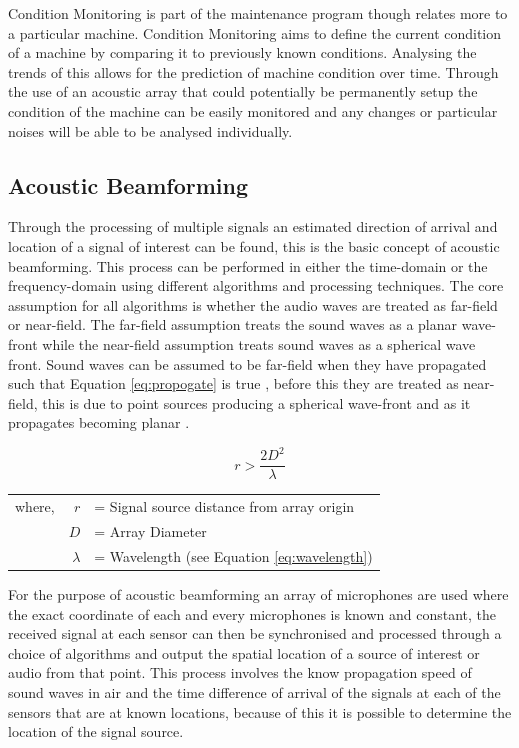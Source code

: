 \documentclass{UoNMCHA}
\numberwithin{equation}{section}
\begin{document}
    Condition Monitoring is part of the maintenance program though relates more to a particular machine. Condition Monitoring aims to define the current condition of a machine by comparing it to previously known conditions. Analysing the trends of this allows for the prediction of machine condition over time. Through the use of an acoustic array that could potentially be permanently setup the condition of the machine can be easily monitored and any changes or particular noises will be able to be analysed individually.
\subsection{Acoustic Beamforming} \label{sec:Beamforming}
    Through the processing of multiple signals an estimated direction of arrival and location of a signal of interest can be found, this is the basic concept of acoustic beamforming. This process can be performed in either the time-domain or the frequency-domain using different algorithms and processing techniques. The core assumption for all algorithms is whether the audio waves are treated as far-field or near-field. The far-field assumption treats the sound waves as a planar wave-front while the near-field assumption treats sound waves as a spherical wave front. Sound waves can be assumed to be far-field when they have propagated such that Equation \ref{eq:propogate} is true \citep{McC01}, before this they are treated as near-field, this is due to point sources producing a spherical wave-front and as it propagates becoming planar \citep{Yan05}. 
    
    \begin{equation}
        r > \frac{2D^2}{\lambda}
        \label{eq:propogate}
    \end{equation}
    \begin{table}[H]
    \centering
        \begin{tabular}{lrl}
            where, & $r$ &= Signal source distance from array origin \\
             & $D$ &= Array Diameter \\
             & $\lambda$ &= Wavelength (see Equation \ref{eq:wavelength})
        \end{tabular}
    \end{table}
    
    For the purpose of acoustic beamforming an array of microphones are used where the exact coordinate of each and every microphones is known and constant, the received signal at each sensor can then be synchronised and processed through a choice of algorithms and output the spatial location of a source of interest or audio from that point. This process involves the know propagation speed of sound waves in air and the time difference of arrival of the signals at each of the sensors that are at known locations, because of this it is possible to determine the location of the signal source.
    
\end{document}
